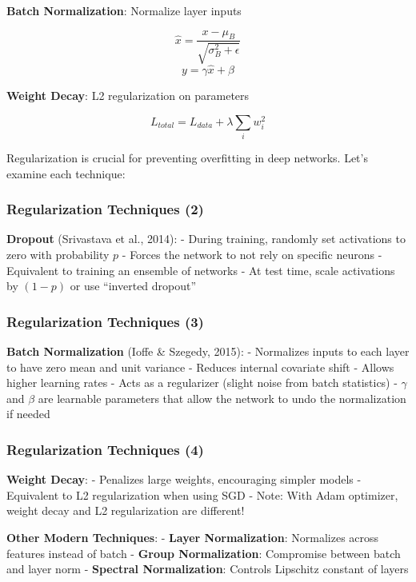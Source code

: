 \documentclass[
]{article}
\begin{document}
\textbf{Batch Normalization}: Normalize layer inputs

\[\hat{x} = \frac{x - \mu_B}{\sqrt{\sigma_B^2 + \epsilon}}\]
\[y = \gamma \hat{x} + \beta\]

\textbf{Weight Decay}: L2 regularization on parameters

\[L_{total} = L_{data} + \lambda \sum_i w_i^2\]

Regularization is crucial for preventing overfitting in deep networks.
Let's examine each technique:

\subsubsection{Regularization Techniques
(2)}\label{regularization-techniques-2}

\textbf{Dropout} (Srivastava et al., 2014): - During training, randomly
set activations to zero with probability \(p\) - Forces the network to
not rely on specific neurons - Equivalent to training an ensemble of
networks - At test time, scale activations by \((1-p)\) or use
``inverted dropout''

\subsubsection{Regularization Techniques
(3)}\label{regularization-techniques-3}

\textbf{Batch Normalization} (Ioffe \& Szegedy, 2015): - Normalizes
inputs to each layer to have zero mean and unit variance - Reduces
internal covariate shift - Allows higher learning rates - Acts as a
regularizer (slight noise from batch statistics) - \(\gamma\) and
\(\beta\) are learnable parameters that allow the network to undo the
normalization if needed

\subsubsection{Regularization Techniques
(4)}\label{regularization-techniques-4}

\textbf{Weight Decay}: - Penalizes large weights, encouraging simpler
models - Equivalent to L2 regularization when using SGD - Note: With
Adam optimizer, weight decay and L2 regularization are different!

\textbf{Other Modern Techniques}: - \textbf{Layer Normalization}:
Normalizes across features instead of batch - \textbf{Group
Normalization}: Compromise between batch and layer norm -
\textbf{Spectral Normalization}: Controls Lipschitz constant of layers
\end{document}
